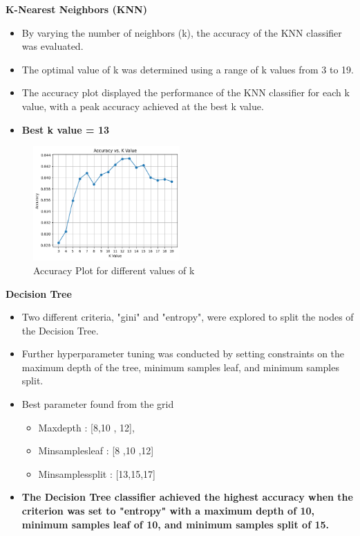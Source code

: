 \documentclass[a4paper]{article}
\theoremstyle{plain}
\theoremstyle{definition}
\begin{document}
\begin{enumerate}
\textbf{K-Nearest Neighbors (KNN)}
\begin{itemize}
    \item By varying the number of neighbors (k), the accuracy of the KNN classifier was evaluated.
    \item The optimal value of k was determined using a range of k values from 3 to 19.
    \item The accuracy plot displayed the performance of the KNN classifier for each k value, with a peak accuracy achieved at the best k value.
    \item\textbf{Best k value = 13}
\end{itemize}
\begin{figure}[h]
    \centering
    \includegraphics[width=0.5\textwidth]{download.png}
    \caption{Accuracy Plot for different values of k}
\end{figure}
\vspace{1cm}
\textbf{Decision Tree}
\begin{itemize}
    \item Two different criteria, "gini" and "entropy", were explored to split the nodes of the Decision Tree.
    \item Further hyperparameter tuning was conducted by setting constraints on the maximum depth of the tree, minimum samples leaf, and minimum samples split.
    \item Best parameter found from the grid 
    \begin{itemize}
        \item Max\textunderscore depth : [8,10 , 12],
        \item Min\textunderscore samples\textunderscore leaf : [8 ,10 ,12]
        \item Min\textunderscore samples\textunderscore split : [13,15,17] 
    \end{itemize}


  

    \item\textbf{The Decision Tree classifier achieved the highest accuracy when the criterion was set to "entropy" with a maximum depth of 10, minimum samples leaf of 10, and minimum samples split of 15.}
\end{itemize}


\end{enumerate}
\end{document}
